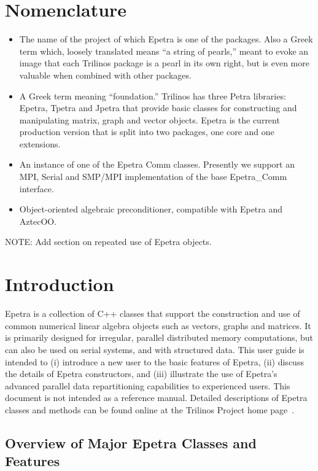 \documentclass[12pt,relax]{EpetraUserGuide}
\newcommand{\comm}{Epetra\_Comm}
\begin{document}
\section*{Nomenclature}
\begin{itemize}
\item[Trilinos]
The name of the project of which Epetra is one of the packages.  Also a Greek term which,
loosely translated means ``a string of pearls,'' 
meant to evoke an image that each Trilinos package is a pearl in its 
own right, but is even more valuable when combined with other 
packages.
\item[Petra]
A Greek term meaning ``foundation.''  Trilinos has three Petra 
libraries: Epetra, Tpetra and Jpetra that provide basic classes 
for constructing and manipulating matrix, graph and vector
objects.  Epetra is the current production version that is
split into two packages, one core and one extensions.
\item[Comm Object]
An instance of one of the Epetra Comm classes.  Presently we support
an MPI, Serial and SMP/MPI implementation of the base \comm{} interface.
\item[Map Object] 
Object-oriented algebraic preconditioner, compatible with 
Epetra and AztecOO.
\end{itemize}

NOTE: Add section on repeated use of Epetra objects.


\section{Introduction}
\label{Section:Introduction}

Epetra is a collection of C++ classes that support the construction
and use of common numerical linear algebra objects such as vectors,
graphs and matrices.  It is primarily designed for irregular, parallel
distributed memory computations, but can also be used on serial
systems, and
with structured data.  This user guide is intended to (i) introduce a new
user to the basic features of Epetra, (ii) discuss the details of Epetra
constructors, and (iii) illustrate the use of
Epetra's advanced parallel data repartitioning capabilities to
experienced users.  This document is not intended as a reference
manual.  Detailed descriptions of Epetra classes and methods can be
found online at the Trilinos Project home page~\cite{Trilinos-home-page}.


\subsection{Overview of Major Epetra Classes and Features}
\label{Section:Introduction:Overview}
\end{document}

